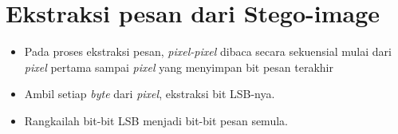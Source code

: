 \documentclass{article}
\begin{document}

\section*{Ekstraksi pesan dari Stego-image}

\begin{itemize}
    \item Pada proses ekstraksi pesan, \textit{pixel-pixel} dibaca secara sekuensial mulai dari \textit{pixel} pertama sampai \textit{pixel} yang menyimpan bit pesan terakhir
    \item Ambil setiap \textit{byte} dari \textit{pixel}, ekstraksi bit LSB-nya.
    \item Rangkailah bit-bit LSB menjadi bit-bit pesan semula.
\end{itemize}
\end{document}
